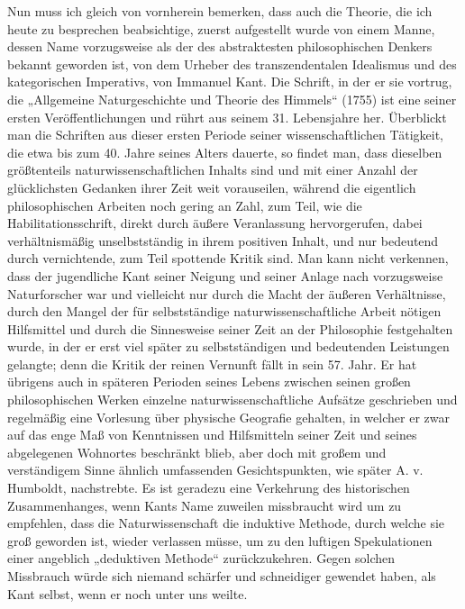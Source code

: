 \documentclass[a4paper, 11pt, oneside, german]{article}
\begin{document}
Nun muss ich gleich von vornherein bemerken, dass auch die Theorie, die ich heute zu besprechen beabsichtige, zuerst aufgestellt wurde von einem Manne, dessen Name vorzugsweise als der des abstraktesten philosophischen Denkers bekannt geworden ist, von dem Urheber des transzendentalen Idealismus und des kategorischen Imperativs, von Immanuel Kant. Die Schrift, in der er sie vortrug, die „Allgemeine Naturgeschichte und Theorie des Himmels“ (1755) ist eine seiner ersten Veröffentlichungen und rührt aus seinem 31. Lebensjahre her. Überblickt man die Schriften aus dieser ersten Periode seiner wissenschaftlichen Tätigkeit, die etwa bis zum 40. Jahre seines Alters dauerte, so findet man, dass dieselben größtenteils naturwissenschaftlichen Inhalts sind und mit einer Anzahl der glücklichsten Gedanken ihrer Zeit weit vorauseilen, während die eigentlich philosophischen Arbeiten noch gering an Zahl, zum Teil, wie die Habilitationsschrift, direkt durch äußere Veranlassung hervorgerufen, dabei verhältnismäßig unselbstständig in ihrem positiven Inhalt, und nur bedeutend durch vernichtende, zum Teil spottende Kritik sind. Man kann nicht verkennen, dass der jugendliche Kant seiner Neigung und seiner Anlage nach vorzugsweise Naturforscher war und vielleicht nur durch die Macht der äußeren Verhältnisse, durch den Mangel der für selbstständige naturwissenschaftliche Arbeit nötigen Hilfsmittel und durch die Sinnesweise seiner Zeit an der Philosophie festgehalten wurde, in der er erst viel später zu selbstständigen und bedeutenden Leistungen gelangte; denn die Kritik der reinen Vernunft fällt in sein 57. Jahr. Er hat übrigens auch in späteren Perioden seines Lebens zwischen seinen großen philosophischen Werken einzelne naturwissenschaftliche Aufsätze geschrieben und regelmäßig eine Vorlesung über physische Geografie gehalten, in welcher er zwar auf das enge Maß von Kenntnissen und Hilfsmitteln seiner Zeit und seines abgelegenen Wohnortes beschränkt blieb, aber doch mit großem und verständigem Sinne ähnlich umfassenden Gesichtspunkten, wie später A. v. Humboldt, nachstrebte. Es ist geradezu eine Verkehrung des historischen Zusammenhanges, wenn Kants Name zuweilen missbraucht wird um zu empfehlen, dass die Naturwissenschaft die induktive Methode, durch welche sie groß geworden ist, wieder verlassen müsse, um zu den luftigen Spekulationen einer angeblich „deduktiven Methode“ zurückzukehren. Gegen solchen Missbrauch würde sich niemand schärfer und schneidiger gewendet haben, als Kant selbst, wenn er noch unter uns weilte.
\end{document}
